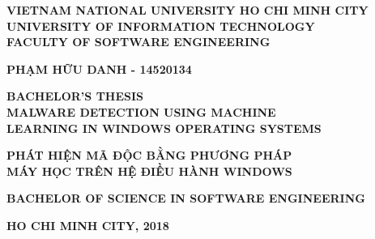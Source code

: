 %
\begin{titlepage}


\thisfancypage{
\setlength{\fboxrule}{2pt}
\setlength{\fboxsep}{15pt}
\doublebox
}{}


\begin{center}
  
\textbf{\large VIETNAM NATIONAL UNIVERSITY HO CHI MINH CITY} \\[2mm]
\textbf{\Large UNIVERSITY OF INFORMATION TECHNOLOGY} \\ [2mm]
\textbf{\Large FACULTY OF SOFTWARE ENGINEERING}

\vspace{0.1\textheight}
\begin{otherlanguage}{vietnamese}
\textbf{\large PHẠM HỮU DANH - 14520134}
\end{otherlanguage}

\vspace{0.1\textheight}
\textbf{\Large BACHELOR’S THESIS} \\ [10mm]

\textbf{\Large MALWARE DETECTION USING MACHINE } \\ [2mm]
\textbf{\Large LEARNING IN WINDOWS OPERATING SYSTEMS } \\ [10mm]

\begin{otherlanguage}{vietnamese}
\textbf{ \Large PHÁT HIỆN MÃ ĐỘC BẰNG PHƯƠNG PHÁP } \\ [2mm]
\textbf{ \Large MÁY HỌC TRÊN HỆ ĐIỀU HÀNH WINDOWS }
\end{otherlanguage}

\vspace{0.15\textheight}

\textbf{\large BACHELOR OF SCIENCE IN SOFTWARE ENGINEERING}

\vspace{\fill}
\textbf{\large HO CHI MINH CITY, 2018}
\end{center}

\end{titlepage}
\cleardoublepage

